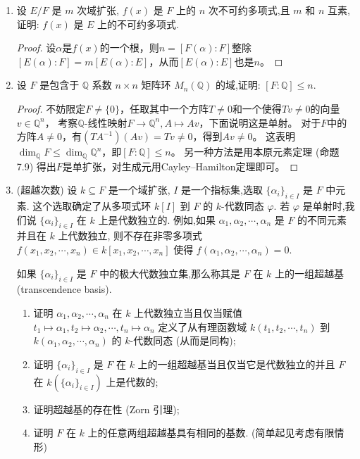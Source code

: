\begin{enumerate}
    \item 设 $E/F$ 是 $m$ 次域扩张, $f(x)$ 是 $F$ 上的 $n$ 次不可约多项式,且 $m$ 和 $n$ 互素,证明: $f(x)$ 是 $E$ 上的不可约多项式.
    \begin{proof}
        设$\alpha$是$f(x)$的一个根，则$n=[F(\alpha):F]$整除$[E(\alpha):F]=m[E(\alpha):E]$，从而$[E(\alpha):E]$也是$n$。
    \end{proof}
    \item 设 $F$ 是包含于 $\mathbb{Q}$ 系数 $n \times n$ 矩阵环 $M_n(\mathbb{Q})$ 的域,证明: $[F: \mathbb{Q}] \leqslant n$.
    \begin{proof}
        不妨限定$F\ne\{0\}$，任取其中一个方阵$T\ne0$和一个使得$Tv\ne0$的向量$v\in\mathbb{Q}^n$，
        考察$\mathbb{Q}$-线性映射$F\to\mathbb{Q}^n,A \mapsto Av$，下面说明这是单射。
        对于$F$中的方阵$A\ne0$，有$(TA^{-1})(Av)=Tv\ne0$，得到$Av\ne0$。
        这表明$\dim_{\mathbb{Q}}F\leqslant\dim_{\mathbb{Q}}\mathbb{Q}^n$，即$[F:\mathbb{Q}] \leqslant n$。
        另一种方法是用本原元素定理 (命题7.9) 得出$F$是单扩张，对生成元用Cayley--Hamilton定理即可。
    \end{proof}
    \item (超越次数) 设 $k \subseteq F$ 是一个域扩张, $I$ 是一个指标集,选取 $\{\alpha_i\}_{i \in I}$ 是 $F$ 中元素.
    这个选取确定了从多项式环 $k[I]$ 到 $F$ 的 $k$-代数同态 $\varphi$.
    若 $\varphi$ 是单射时,我们说 $\{\alpha_i\}_{i \in I}$ 在 $k$ 上是代数独立的.
    例如,如果 $\alpha_1, \alpha_2, \cdots, \alpha_n$ 是 $F$ 的不同元素并且在 $k$ 上代数独立,
    则不存在非零多项式 $f(x_1, x_2, \cdots, x_n) \in k[x_1, x_2, \cdots, x_n]$ 使得 $f(\alpha_1, \alpha_2, \cdots, \alpha_n) = 0$.

    如果 $\{\alpha_i\}_{i \in I}$ 是 $F$ 中的极大代数独立集,那么称其是 $F$ 在 $k$ 上的一组超越基 (transcendence basis).

    \begin{enumerate}[label=(\arabic*)]
        \item 证明 $\alpha_1, \alpha_2, \cdots, \alpha_n$ 在 $k$ 上代数独立当且仅当赋值 $t_1 \mapsto \alpha_1, t_2 \mapsto \alpha_2, \cdots, t_n \mapsto \alpha_n$ 定义了从有理函数域 $k(t_1, t_2, \cdots, t_n)$ 到 $k(\alpha_1, \alpha_2, \cdots, \alpha_n)$ 的 $k$-代数同态 (从而是同构);
        \item 证明 $\{\alpha_i\}_{i \in I}$ 是 $F$ 在 $k$ 上的一组超越基当且仅当它是代数独立的并且 $F$ 在 $k(\{\alpha_i\}_{i \in I})$ 上是代数的;
        \item 证明超越基的存在性 (Zorn 引理);
        \item 证明 $F$ 在 $k$ 上的任意两组超越基具有相同的基数. (简单起见考虑有限情形)
    \end{enumerate}


\end{enumerate}
